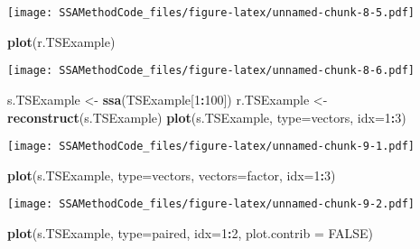 \documentclass[
]{article}
\newenvironment{Shaded}{\begin{snugshade}}{\end{snugshade}}
\newcommand{\AttributeTok}[1]{\textcolor[rgb]{0.13,0.29,0.53}{#1}}
\newcommand{\ConstantTok}[1]{\textcolor[rgb]{0.56,0.35,0.01}{#1}}
\newcommand{\DecValTok}[1]{\textcolor[rgb]{0.00,0.00,0.81}{#1}}
\newcommand{\FunctionTok}[1]{\textcolor[rgb]{0.13,0.29,0.53}{\textbf{#1}}}
\newcommand{\NormalTok}[1]{#1}
\newcommand{\OtherTok}[1]{\textcolor[rgb]{0.56,0.35,0.01}{#1}}
\newcommand{\SpecialCharTok}[1]{\textcolor[rgb]{0.81,0.36,0.00}{\textbf{#1}}}
\newcommand{\StringTok}[1]{\textcolor[rgb]{0.31,0.60,0.02}{#1}}
\begin{document}
\texttt{[image: SSAMethodCode\_files/figure-latex/unnamed-chunk-8-5.pdf]}

\begin{Shaded}
\begin{Highlighting}[]
\FunctionTok{plot}\NormalTok{(r.TSExample)}
\end{Highlighting}
\end{Shaded}

\texttt{[image: SSAMethodCode\_files/figure-latex/unnamed-chunk-8-6.pdf]}

\begin{Shaded}
\begin{Highlighting}[]
\NormalTok{s.TSExample }\OtherTok{\textless{}{-}} \FunctionTok{ssa}\NormalTok{(TSExample[}\DecValTok{1}\SpecialCharTok{:}\DecValTok{100}\NormalTok{])}
\NormalTok{r.TSExample }\OtherTok{\textless{}{-}} \FunctionTok{reconstruct}\NormalTok{(s.TSExample)}
\FunctionTok{plot}\NormalTok{(s.TSExample, }\AttributeTok{type=}\StringTok{\textquotesingle{}vectors\textquotesingle{}}\NormalTok{, }\AttributeTok{idx=}\DecValTok{1}\SpecialCharTok{:}\DecValTok{3}\NormalTok{)}
\end{Highlighting}
\end{Shaded}

\texttt{[image: SSAMethodCode\_files/figure-latex/unnamed-chunk-9-1.pdf]}

\begin{Shaded}
\begin{Highlighting}[]
\FunctionTok{plot}\NormalTok{(s.TSExample, }\AttributeTok{type=}\StringTok{\textquotesingle{}vectors\textquotesingle{}}\NormalTok{, }\AttributeTok{vectors=}\StringTok{\textquotesingle{}factor\textquotesingle{}}\NormalTok{, }\AttributeTok{idx=}\DecValTok{1}\SpecialCharTok{:}\DecValTok{3}\NormalTok{)}
\end{Highlighting}
\end{Shaded}

\texttt{[image: SSAMethodCode\_files/figure-latex/unnamed-chunk-9-2.pdf]}

\begin{Shaded}
\begin{Highlighting}[]
\FunctionTok{plot}\NormalTok{(s.TSExample, }\AttributeTok{type=}\StringTok{\textquotesingle{}paired\textquotesingle{}}\NormalTok{, }\AttributeTok{idx=}\DecValTok{1}\SpecialCharTok{:}\DecValTok{2}\NormalTok{, }\AttributeTok{plot.contrib =} \ConstantTok{FALSE}\NormalTok{)}
\end{Highlighting}
\end{Shaded}
\end{document}
